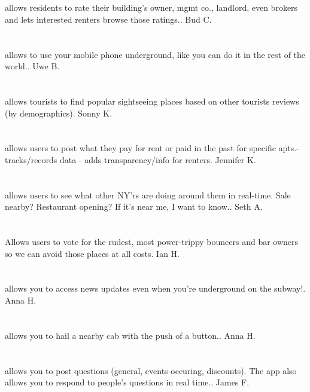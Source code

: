 \section{}allows residents to rate their building's owner,  mgmt co.,  landlord,  even brokers and lets interested renters browse those ratings.. Bud C.
\section{}allows to use your mobile phone underground,  like you can do it in the rest of the world.. Uwe B.
\section{}allows tourists to find popular sightseeing places based on other tourists reviews (by demographics). Sonny K.
\section{}allows users to post what they pay for rent or paid in the past for specific apts.-tracks/records data - adds transparency/info for renters. Jennifer K.
\section{}allows users to see what other NY'rs are doing around them in real-time. Sale nearby? Restaurant opening? If it's near me,  I want to know.. Seth A.
\section{}Allows users to vote for the rudest,  most power-trippy bouncers and bar owners so we can avoid those places at all costs. Ian H.
\section{}allows you to access news updates even when you're underground on the subway!. Anna H.
\section{}allows you to hail a nearby cab with the push of a button.. Anna H.
\section{}allows you to post questions (general,  events occuring,  discounts). The app also allows you to respond to people's questions in real time.. James F.
